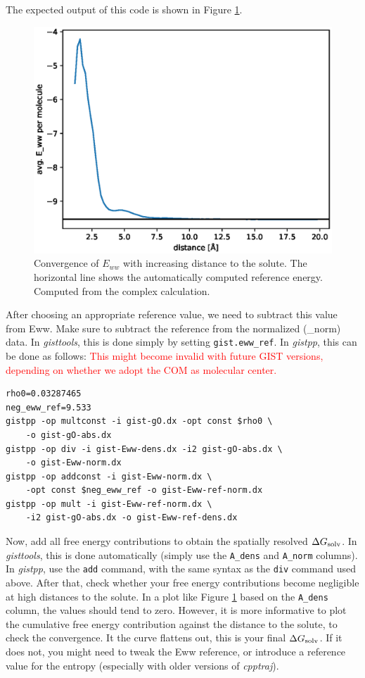 \documentclass[9pt,tutorial]{livecoms}
\newcommand{\dgsolv}{\Delta G_\textup{solv}}
\newcommand{\software}{\emph}
\newcommand{\todo}{\textcolor{red}}
\newcommand\inlinecode{\texttt}
\begin{document}
The expected output of this code is shown in Figure \ref{fig_ewwref}.

\begin{figure}
	\centering
	\includegraphics[width=0.8\linewidth]{figures/Eww_convergence.eps}
	\caption{Convergence of $E_{ww}$ with increasing distance to the solute. The horizontal line shows the automatically computed reference energy. Computed from the complex calculation.}
	\label{fig_ewwref}
\end{figure}

After choosing an appropriate reference value, we need to subtract this value from Eww.
Make sure to subtract the reference from the normalized (\_norm) data.
In \software{gisttools}, this is done simply by setting \inlinecode{gist.eww\_ref}.
In \software{gistpp}, this can be done as follows: \todo{This might become invalid with future GIST versions, depending on whether we adopt the COM as molecular center.}

\begin{lstlisting}
rho0=0.03287465
neg_eww_ref=9.533
gistpp -op multconst -i gist-gO.dx -opt const $rho0 \
    -o gist-gO-abs.dx 
gistpp -op div -i gist-Eww-dens.dx -i2 gist-gO-abs.dx \
    -o gist-Eww-norm.dx
gistpp -op addconst -i gist-Eww-norm.dx \
    -opt const $neg_eww_ref -o gist-Eww-ref-norm.dx
gistpp -op mult -i gist-Eww-ref-norm.dx \
    -i2 gist-gO-abs.dx -o gist-Eww-ref-dens.dx
\end{lstlisting}

Now, add all free energy contributions to obtain the spatially resolved $\dgsolv$.
In \software{gisttools}, this is done automatically (simply use the \inlinecode{A\_dens} and \inlinecode{A\_norm} columns).
In \software{gistpp}, use the \inlinecode{add} command, with the same syntax as the \inlinecode{div} command used above.
After that, check whether your free energy contributions become negligible at high distances to the solute.
In a plot like Figure \ref{fig_ewwref} based on the \inlinecode{A\_dens} column, the values should tend to zero.
However, it is more informative to plot the cumulative free energy contribution against the distance to the solute, to check the convergence.
It the curve flattens out, this is your final $\dgsolv$.
If it does not, you might need to tweak the Eww reference, or introduce a reference value for the entropy (especially with older versions of \software{cpptraj}).
\end{document}
